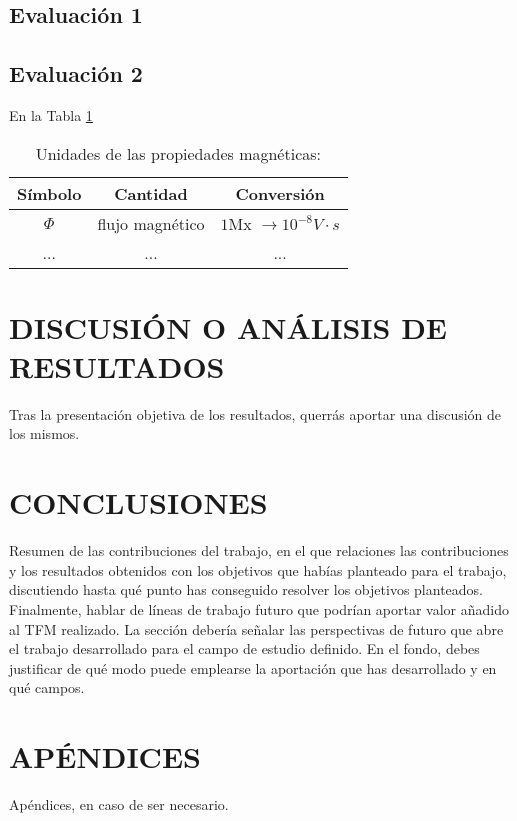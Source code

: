 \documentclass[11pt,a4paper,english,twocolumn]{article}
\begin{document}
\subsection{Evaluación 1}

\subsection{Evaluación 2 }
En la Tabla \ref{tab_1}
\begin{table}\label{tab_1}
\caption{Unidades de las propiedades magnéticas:}

\begin{tabular}{ccc}\hline\hline
Símbolo & Cantidad & Conversión\\
\hline
$\Phi$ & flujo magnético & $1$Mx $\rightarrow 10^{-8}V\cdot s$\\
... &...&...\\
\hline\hline
\end{tabular}
\end{table}

\section{DISCUSIÓN O ANÁLISIS DE RESULTADOS}
Tras la presentación objetiva de los resultados, querrás aportar una discusión de los mismos.

\section{CONCLUSIONES}
Resumen de las contribuciones del trabajo, en el que relaciones las contribuciones y los resultados obtenidos con los objetivos que habías planteado para el trabajo, discutiendo hasta qué punto has conseguido resolver los objetivos planteados.
Finalmente, hablar de líneas de trabajo futuro que podrían aportar valor añadido al TFM realizado. La sección debería señalar las perspectivas de futuro que abre el trabajo desarrollado para el campo de estudio definido. En el fondo, debes justificar de qué modo puede emplearse la aportación que has desarrollado y en qué campos.

\appendix
\section{APÉNDICES}
Apéndices, en caso de ser necesario.



\end{document}

